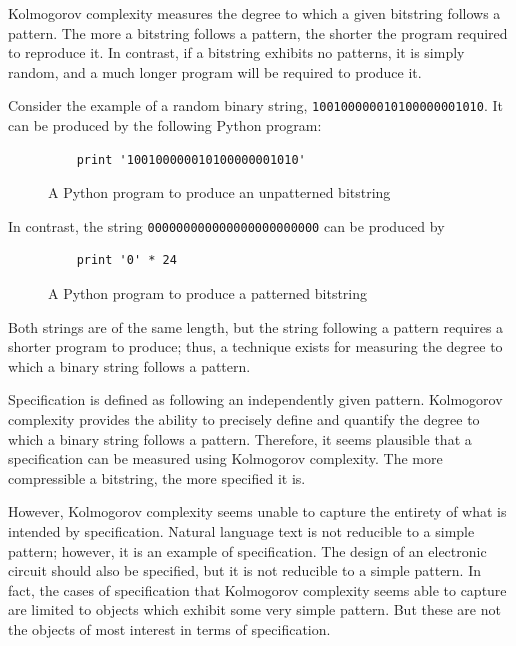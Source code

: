 Kolmogorov complexity measures the degree to which a given bitstring follows a pattern.
The more a bitstring follows a pattern, the shorter the program required to reproduce it.
In contrast, if a bitstring exhibits no patterns, it is simply random, and a much longer program will be required to produce it.

Consider the example of a random binary string, {\tt 100100000010100000001010}.
It can be produced by the following Python program:

\begin{figure}[H]
\begin{mdframed}
\begin{verbatim}
    print '100100000010100000001010'
\end{verbatim}
\end{mdframed}
\caption{A Python program to produce an unpatterned bitstring}
\end{figure}

In contrast, the string {\tt 000000000000000000000000} can be produced by

\begin{figure}[H]
\begin{mdframed}
\begin{verbatim}
    print '0' * 24
\end{verbatim}
\end{mdframed}
\caption{A Python program to produce a patterned bitstring}
\end{figure}

Both strings are of the same length, but the string following a pattern requires a shorter program to produce;
thus, a technique exists for measuring the degree to which a binary string follows a pattern.

Specification is defined as following an independently given pattern.
Kolmogorov complexity provides the ability to precisely define and quantify the degree to which a binary string follows a pattern.
Therefore, it seems plausible that a specification can be measured using Kolmogorov complexity.
The more compressible a bitstring, the more specified it is.

However, Kolmogorov complexity seems unable to capture the entirety of what is intended by specification.
Natural language text is not reducible to a simple pattern; however, it is an example of specification.
The design of an electronic circuit should also be specified, but it is not reducible to a simple pattern.
In fact, the cases of specification that Kolmogorov complexity seems able to capture are limited to objects which exhibit some very simple pattern.
But these are not the objects of most interest in terms of specification.

